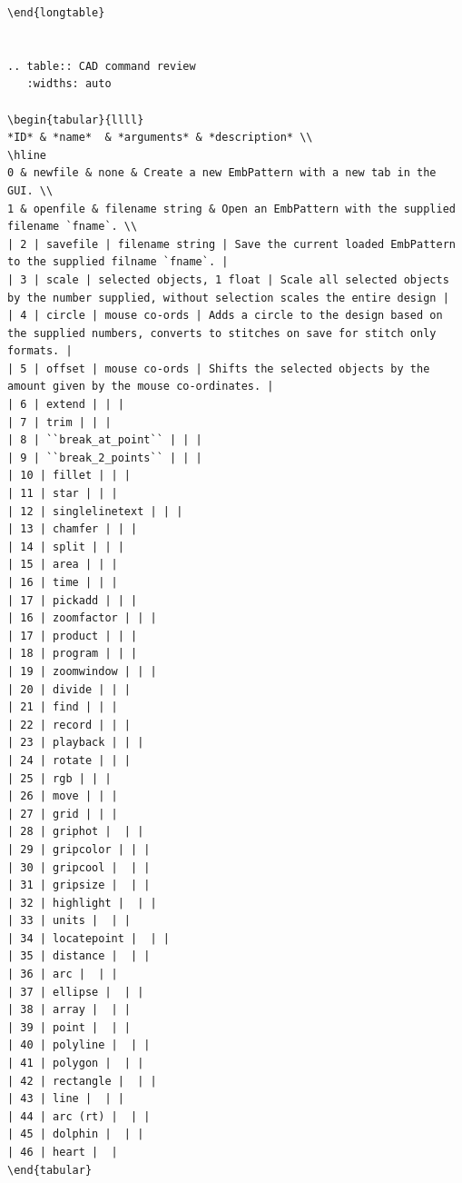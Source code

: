 \documentclass[11pt]{report}
\begin{document}
\begin{verbatim}
\end{longtable}


.. table:: CAD command review
   :widths: auto

\begin{tabular}{llll}
*ID* & *name*  & *arguments* & *description* \\
\hline
0 & newfile & none & Create a new EmbPattern with a new tab in the GUI. \\
1 & openfile & filename string & Open an EmbPattern with the supplied filename `fname`. \\
| 2 | savefile | filename string | Save the current loaded EmbPattern to the supplied filname `fname`. |
| 3 | scale | selected objects, 1 float | Scale all selected objects by the number supplied, without selection scales the entire design |
| 4 | circle | mouse co-ords | Adds a circle to the design based on the supplied numbers, converts to stitches on save for stitch only formats. |
| 5 | offset | mouse co-ords | Shifts the selected objects by the amount given by the mouse co-ordinates. |
| 6 | extend | | |
| 7 | trim | | |
| 8 | ``break_at_point`` | | |
| 9 | ``break_2_points`` | | |
| 10 | fillet | | |
| 11 | star | | |
| 12 | singlelinetext | | |
| 13 | chamfer | | |
| 14 | split | | |
| 15 | area | | |
| 16 | time | | |
| 17 | pickadd | | |
| 16 | zoomfactor | | |
| 17 | product | | |
| 18 | program | | |
| 19 | zoomwindow | | |
| 20 | divide | | |
| 21 | find | | |
| 22 | record | | |
| 23 | playback | | |
| 24 | rotate | | |
| 25 | rgb | | |
| 26 | move | | |
| 27 | grid | | |
| 28 | griphot |  | |
| 29 | gripcolor | | |
| 30 | gripcool |  | |
| 31 | gripsize |  | |
| 32 | highlight |  | |
| 33 | units |  | |
| 34 | locatepoint |  | |
| 35 | distance |  | |
| 36 | arc |  | |
| 37 | ellipse |  | |
| 38 | array |  | |
| 39 | point |  | |
| 40 | polyline |  | |
| 41 | polygon |  | |
| 42 | rectangle |  | |
| 43 | line |  | |
| 44 | arc (rt) |  | |
| 45 | dolphin |  | |
| 46 | heart |  |
\end{tabular}


\end{verbatim}
\end{document}
